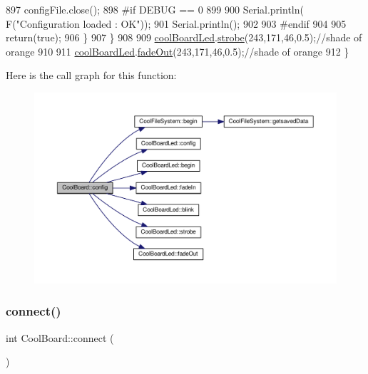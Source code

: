 \begin{DoxyCode}
897             configFile.close();
898 \textcolor{preprocessor}{            #if DEBUG == 0}
899 
900                 Serial.println( F(\textcolor{stringliteral}{"Configuration loaded : OK"}));
901                 Serial.println();
902 
903 \textcolor{preprocessor}{            #endif}
904 
905             \textcolor{keywordflow}{return}(\textcolor{keyword}{true});
906         \}
907     \}
908 
909     \hyperlink{class_cool_board_a1b1d3c684a5baa56b08486e192fd8e97}{coolBoardLed}.\hyperlink{class_cool_board_led_ad5f0de4c628cbfbf49896042831c64ad}{strobe}(243,171,46,0.5);\textcolor{comment}{//shade of orange}
910     
911     \hyperlink{class_cool_board_a1b1d3c684a5baa56b08486e192fd8e97}{coolBoardLed}.\hyperlink{class_cool_board_led_a93d545679237e8cc858324367149775c}{fadeOut}(243,171,46,0.5);\textcolor{comment}{//shade of orange               }
912 \}
\end{DoxyCode}
Here is the call graph for this function\+:\nopagebreak
\begin{figure}[H]
\begin{center}
\leavevmode
\includegraphics[width=350pt]{d7/df9/class_cool_board_a583a874c09c07e70a6eb9229fc4beddb_cgraph}
\end{center}
\end{figure}
\mbox{\label{class_cool_board_a519de78b807f8ec6463ff484eb925918}} 
\subsubsection{\texorpdfstring{connect()}{connect()}}
{\footnotesize\ttfamily int Cool\+Board\+::connect (\begin{DoxyParamCaption}{ }\end{DoxyParamCaption})}

